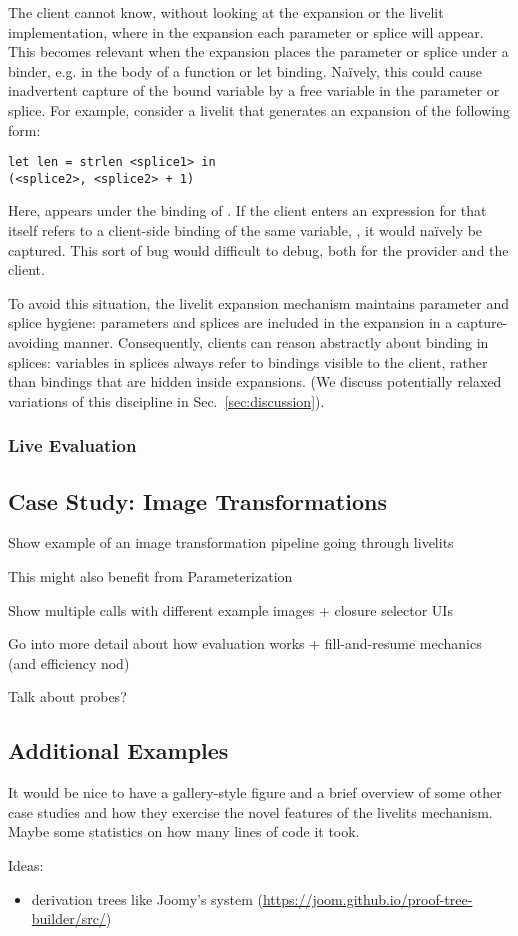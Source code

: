 The client cannot know, without looking at the expansion or the livelit implementation, 
where in the expansion each parameter or splice will appear. This becomes relevant when 
the expansion places the parameter or splice under a binder, e.g. in the body of a function or let binding.
Na\"ively, this could cause inadvertent capture of the bound variable by a free variable 
in the parameter or splice. For example, consider a livelit that generates an expansion 
of the following form:
\begin{lstlisting}[numbers=none]
let len = strlen <splice1> in 
(<splice2>, <splice2> + 1)
\end{lstlisting}
Here,  appears under the binding of . If the client enters an expression
for  that itself refers to a client-side binding of the same variable, ,
it would na\"ively be captured. This sort of bug would difficult to debug, both for the provider
and the client. 

To avoid this situation, the livelit expansion mechanism 
maintains parameter and splice hygiene: parameters and splices are included in the expansion 
in a capture-avoiding manner.
Consequently, clients can reason abstractly about binding in splices: variables in splices
always refer to bindings visible to the client, rather than bindings that are hidden inside expansions.
(We discuss potentially relaxed variations of this discipline in Sec.~\ref{sec:discussion}).
\subsubsection{Live Evaluation}\label{sec:live-evaluation}

\subsection{Case Study: Image Transformations}\label{sec:image-transformation}
Show example of an image transformation pipeline going through livelits

This might also benefit from Parameterization

Show multiple calls with different example images + closure selector UIs

Go into more detail about how evaluation works + fill-and-resume mechanics (and efficiency nod)

Talk about probes?

\subsection{Additional Examples}\label{sec:additional-examples}
It would be nice to have a gallery-style figure and a brief overview of some other case studies
and how they exercise the novel features of the livelits mechanism. Maybe some statistics on how
many lines of code it took.

Ideas:
\begin{itemize}
  \item derivation trees like Joomy's system (\url{https://joom.github.io/proof-tree-builder/src/})
\end{itemize}